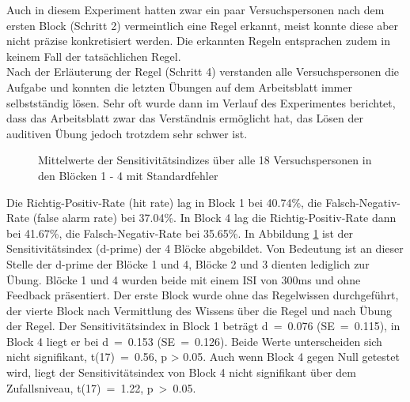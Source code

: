 \documentclass[doc,a4paper,12pt]{apa6}
\begin{document}
Auch in diesem Experiment hatten zwar ein paar Versuchspersonen nach dem ersten Block (Schritt 2) vermeintlich eine Regel erkannt, meist konnte diese aber nicht präzise konkretisiert werden. Die erkannten Regeln entsprachen zudem in keinem Fall der tatsächlichen Regel.\\
Nach der Erläuterung der Regel (Schritt 4) verstanden alle Versuchspersonen die Aufgabe und konnten die letzten Übungen auf dem Arbeitsblatt immer selbstständig lösen. Sehr oft wurde dann im Verlauf des Experimentes berichtet, dass das Arbeitsblatt zwar das Verständnis ermöglicht hat, das Lösen der auditiven Übung jedoch trotzdem sehr schwer ist.

\begin{figure}[t]
  \centering
  \begin{minipage}{\textwidth}
    \vspace{10pt}
    \caption{Mittelwerte der Sensitivitätsindizes über alle 18 Versuchspersonen in den Blöcken 1 - 4 mit Standardfehler}
    \label{dprime}
  \end{minipage}
\end{figure}

Die Richtig-Positiv-Rate (hit rate) lag in Block 1 bei 40.74\%, die Falsch-Negativ-Rate (false alarm rate) bei 37.04\%. In Block 4 lag die Richtig-Positiv-Rate dann bei 41.67\%, die Falsch-Negativ-Rate bei 35.65\%. In Abbildung \ref{dprime} ist der Sensitivitätsindex (d-prime) der 4 Blöcke abgebildet. Von Bedeutung ist an dieser Stelle der d-prime der Blöcke 1 und 4, Blöcke 2 und 3 dienten lediglich zur Übung. Blöcke 1 und 4 wurden beide mit einem ISI von 300ms und ohne Feedback präsentiert. Der erste Block wurde ohne das Regelwissen durchgeführt, der vierte Block nach Vermittlung des Wissens über die Regel und nach Übung der Regel. Der Sensitivitätsindex in Block 1 beträgt d~=~0.076 (SE~=~0.115), in Block 4 liegt er bei d~=~0.153 (SE~=~0.126). Beide Werte unterscheiden sich nicht signifikant, t(17)~=~0.56, p > 0.05. Auch wenn Block 4 gegen Null getestet wird, liegt der Sensitivitätsindex von Block 4 nicht signifikant über dem Zufallsniveau, t(17)~=~1.22, p~>~0.05.
\end{document}
